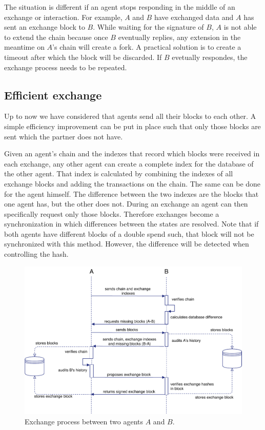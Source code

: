 The situation is different if an agent stops responding in the middle of an exchange or interaction.
For example, $A$ and $B$ have exchanged data and $A$ has sent an exchange block to $B$. While waiting
for the signature of $B$, $A$ is not able to extend the chain because once $B$ eventually replies,
any extension in the meantime on $A$'s chain will create a fork. A practical solution is to create 
a timeout after which the block will be discarded. If $B$ evetually respondes, the exchange process 
needs to be repeated. 

\subsection{Efficient exchange}
Up to now we have considered that agents send all their blocks to each other. A simple efficiency 
improvement can be put in place such that only those blocks are sent which the partner does not have.

Given an agent's chain and the indexes that record which blocks were received in each exchange, any
other agent can create a complete index for the database of the other agent. That index is calculated
by combining the indexes of all exchange blocks and adding the transactions on the chain. The same
can be done for the agent himself. The difference between the two indexes are the blocks that one
agent has, but the other does not. During an exchange an agent can then specifically request only
those blocks. Therefore exchanges become a synchronization in which differences between the states
are resolved. Note that if both agents have different blocks of a double spend such, that block will
not be synchronized with this method. However, the difference will be detected when controlling the
hash.

\begin{figure}[!ht]
    \centering
    \includegraphics[width=\textwidth]{images/exchange_process.pdf}
    \caption{Exchange process between two agents $A$ and $B$.}
    \label{ref:exchange_process}
\end{figure}

